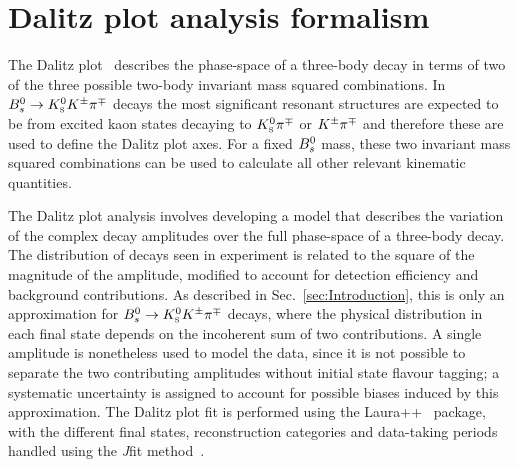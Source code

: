 \section{Dalitz plot analysis formalism}
\label{sec:formalism}

The Dalitz plot~\cite{Dalitz:1953cp} describes the phase-space of a three-body decay in terms of two of the three possible two-body invariant mass squared combinations.
In ${{B}^0_{s}} \rightarrow {\ensuremath{{K}^0_{\mathrm{ \scriptscriptstyle S}}}}{\ensuremath{{K}^\pm}}{\ensuremath{{\pi}^\mp}}$ decays the most significant resonant structures are expected to be from excited kaon states decaying to ${{K}^0_{\mathrm{ \scriptscriptstyle S}}}{{\pi}^\mp}$ or ${{K}^\pm}{{\pi}^\mp}$ and therefore these are used to define the Dalitz plot axes.
For a fixed ${{B}^0_{s}}$ mass, these two invariant mass squared combinations can be used to calculate all other relevant kinematic quantities.

The Dalitz plot analysis involves developing a model that describes the variation of the complex decay amplitudes over the full phase-space of a three-body decay.
The distribution of decays seen in experiment is related to the square of the magnitude of the amplitude, modified to account for detection efficiency and background contributions.  
As described in Sec.~\ref{sec:Introduction}, this is only an approximation for ${{B}^0_{s}} \rightarrow {\ensuremath{{K}^0_{\mathrm{ \scriptscriptstyle S}}}}{\ensuremath{{K}^\pm}}{\ensuremath{{\pi}^\mp}}$ decays, where the physical distribution in each final state depends on the incoherent sum of two contributions.  
A single amplitude is nonetheless used to model the data, since it is not possible to separate the two contributing amplitudes without initial state flavour tagging; a systematic uncertainty is assigned to account for possible biases induced by this approximation.
The Dalitz plot fit is performed using the {\sc Laura++}~\cite{Laura++} package, with the different final states, \KS reconstruction categories and data-taking periods handled using the {\it J}{\sc fit} method~\cite{Ben-Haim:2014afa}.

